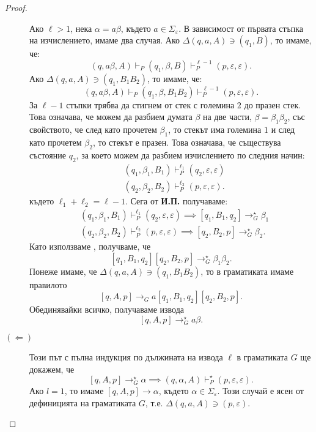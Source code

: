\begin{proof}
\begin{description}
    Ако $\ell > 1$, нека $\alpha = a\beta$, където $a \in \Sigma_\varepsilon$.
    В зависимост от първата стъпка на изчислението, имаме два случая.
    Ако $\Delta(q,a,A) \ni (q_1,B)$, то имаме, че:
    \[(q,a\beta,A) \vdash_P (q_1,\beta,B) \vdash^{\ell-1}_P (p, \varepsilon, \varepsilon).\]
    Ако $\Delta(q,a,A) \ni (q_1,B_1B_2)$, то имаме, че:
    \[(q,a\beta,A) \vdash_P (q_1,\beta,B_1B_2) \vdash^{\ell-1}_P (p, \varepsilon, \varepsilon).\]
    За $\ell-1$ стъпки трябва да стигнем от стек с големина $2$ до празен стек.
    Това означава, че можем да разбием думата $\beta$ на две части, $\beta = \beta_1\beta_2$, със свойството, че след като прочетем $\beta_1$,
    то стекът има големина $1$ и след като прочетем $\beta_2$, то стекът е празен.
    Това означава, че съществува състояние $q_2$, за което можем да разбием изчислението по следния начин:
    \begin{align*}
      & (q_1, \beta_1, B_1) \vdash^{\ell_1}_P (q_{2},\varepsilon,\varepsilon)\\
      & (q_2, \beta_2, B_2) \vdash^{\ell_2}_P (p,\varepsilon,\varepsilon).
    \end{align*}
    където $\ell_1 + \ell_2 = \ell - 1$.
    Сега от {\bf И.П.} получаваме:
    \begin{align*}
      & (q_1, \beta_1, B_1) \vdash^{\ell_1}_P (q_{2},\varepsilon,\varepsilon) \implies [q_1,B_1, q_{2}] \to^\star_G \beta_1\\
      & (q_2, \beta_2, B_2) \vdash^{\ell_2}_P (p,\varepsilon,\varepsilon) \implies [q_2,B_2, p] \to^\star_G \beta_2.
    \end{align*}
    Като използваме , получваме, че
    \[[q_1,B_1,q_2][q_2,B_2,p] \to^\star_G \beta_1\beta_2.\]
    Понеже имаме, че $\Delta(q,a,A) \ni (q_1,B_1B_2)$, то в граматиката имаме правилото
    \[[q,A,p] \rightarrow_G a[q_1,B_1,q_2][q_2,B_2,p].\]
    Обединявайки всичко, получаваме извода
    \[[q,A,p] \rightarrow^\star_G a\beta.\]
  \item[$(\Leftarrow)$]
    Този път с пълна индукция по дължината на извода $\ell$ в граматиката $G$ ще докажем, че
    \[[q,A,p] \rightarrow^\star_G \alpha \implies (q,\alpha,A) \vdash^\star_P (p,\varepsilon,\varepsilon).\]
    Ако $l = 1$, то имаме $[q,A,p] \rightarrow \alpha$, където $\alpha \in \Sigma_\varepsilon$.
    Този случай е ясен от дефиницията на граматиката $G$, т.е. $\Delta(q,a,A) \ni (p,\varepsilon)$.


\end{description}
\end{proof}
